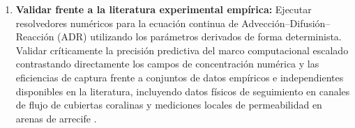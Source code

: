 \begin{enumerate}
    \item \textbf{Validar frente a la literatura experimental empírica:} Ejecutar resolvedores numéricos para la ecuación continua de Advección--Difusión--Reacción (ADR) utilizando los parámetros derivados de forma determinista. Validar críticamente la precisión predictiva del marco computacional escalado contrastando directamente los campos de concentración numérica y las eficiencias de captura frente a conjuntos de datos empíricos e independientes disponibles en la literatura, incluyendo datos físicos de seguimiento en canales de flujo de cubiertas coralinas y mediciones locales de permeabilidad en arenas de arrecife \cite{mendrik2024microplastic, reidenbach2006boundary}.
\end{enumerate}
